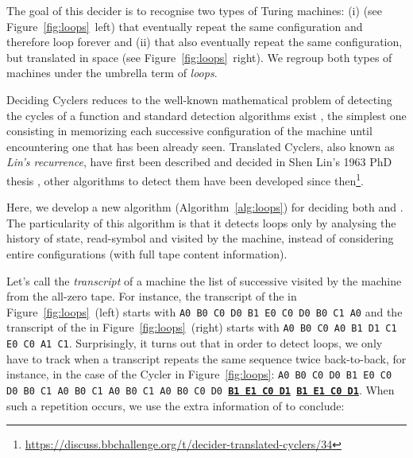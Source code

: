
The goal of this decider is to recognise two types of Turing machines: (i) \textit{\cyclers} (see Figure~\ref{fig:loops}~left) that eventually repeat the same configuration and therefore loop forever and (ii) \textit{\TCs} that also eventually repeat the same configuration, but translated in space (see Figure~\ref{fig:loops}~right). We regroup both types of machines under the umbrella term of \textit{loops}.

Deciding Cyclers reduces to the well-known mathematical problem of detecting the cycles of a function and standard detection algorithms exist \cite{wiki:Cycle_detection}, the simplest one consisting in memorizing each successive configuration of the machine until encountering one that has been already seen. Translated Cyclers, also known as \textit{Lin's recurrence}, have first been described and decided in Shen Lin's 1963 PhD thesis \cite{Lin1963}, other algorithms to detect them have been developed since then\footnote{\url{https://discuss.bbchallenge.org/t/decider-translated-cyclers/34}}.

Here, we develop a new algorithm (Algorithm~\ref{alg:loops}) for deciding both \cyclers and \TCs. The particularity of this algorithm is that it detects loops only by analysing the history of state, read-symbol and \headposs visited by the machine, instead of considering entire configurations (\ie with full tape content information).

Let's call the \textit{transcript} of a machine the list of successive \ssps visited by the machine from the all-zero tape. For instance, the transcript of the \cycler in Figure~\ref{fig:loops}~(left) starts with \texttt{A0 B0 C0 D0 B1 E0 C0 D0 B0 C1 A0} and the transcript of the \TC in Figure~\ref{fig:loops}~(right) starts with \texttt{A0 B0 C0 A0 B1 D1 C1 E0 C0 A1 C1}. Surprisingly, it turns out that in order to detect loops, we only have to track when a transcript repeats the same sequence twice back-to-back, for instance, in the case of the Cycler in Figure~\ref{fig:loops}: \texttt{A0 B0 C0 D0 B1 E0 C0 D0 B0 C1 A0 B0 C1 A0 B0 C1 A0 B0 C0 D0 \textbf{\underline{B1 E1 C0 D1}} \textbf{\underline{B1 E1 C0 D1}}}. When such a repetition occurs, we use the extra information of \headpos to conclude:

